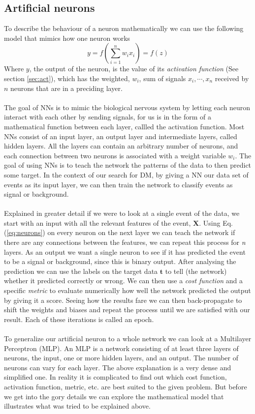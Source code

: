 \documentclass[14pt, a4paper]{book}
\begin{document}
\subsection{Artificial neurons}\label{sec:neurons}
To describe the behaviour of a neuron mathematically we can use the following model that mimics how one neuron works
\begin{equation}\label{eq:neurons}
    y=f\left(\sum_{i=1}^{n}w_ix_i\right)=f(z)
\end{equation}
Where $y$, the output of the neuron, is the value of its \textit{activation function} (See section \ref{sec:act}), which has the weighted, $w_i$, sum of signals $x_i,\cdots,x_n$ received by $n$ neurons that are in a preciding layer.\\
\\The goal of NNs is to mimic the biological nervous system by letting each neuron interact with each other by sending signals, for us is in the form of a mathematical function between each layer, callled the activation function. 
Most NNs consist of an input layer, an output layer and intermediate layers, called hidden layers. All the layers can contain an arbitrary number of neurons, and each connection between two neurons is associated with a weight variable $w_i$.
The goal of using NNs is to teach the network the patterns of the data to then predict some target. In the context of our search for DM, by giving a NN our data set of events as its input layer, we can then train the network to classify events as signal or background.\\
\\Explained in greater detail if we were to look at a single event of the data, we start with an input with all the relevant features of the event, $\bm X$. Using Eq. (\ref{eq:neurons}) on every neuron on the next layer we can teach the network if there 
are any connections between the features, we can repeat this process for \textit{n} layers. As an output we want a single neuron to see if it has predicted the event to be a signal or background, since this is binary output. After analysing the prediction we can use the labels on the target data $\bm t$ 
to tell (the network) whether it predicted correctly or wrong. We can then use a \textit{cost function} and a specific \textit{metric} to evaluate numerically how well the network predicted the output by giving it a score. 
Seeing how the results fare we can then back-propagate to shift the weights and biases and repeat the process until we are satisfied with our result. Each of these iterations is called an epoch.\\
\\To generalize our artificial neuron to a whole network we can look at a Multilayer Perceptron (MLP). An MLP is a network consisting of at least three layers of neurons, the input, one or more hidden layers, and an output. 
The number of neurons can vary for each layer. The above explanation is a very dense and simplified one. In reality it is complicated to find out which cost function, activation function, metric, etc. are best suited to the given problem. 
But before we get into the gory details we can explore the mathematical model that illustrates what was tried to be explained above. 
\end{document}
